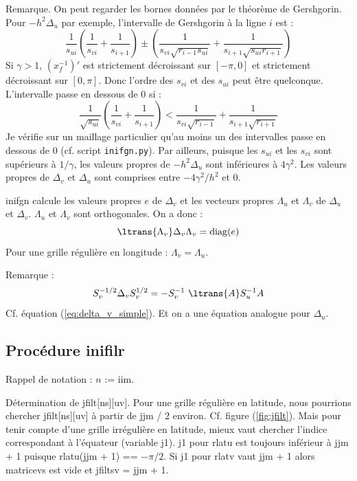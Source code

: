 \documentclass[a4paper,english,french]{article}
\begin{document}
Remarque. On peut regarder les bornes données par le théorème de
Gershgorin. Pour $- h^2 \Delta_u$ par exemple, l'intervalle de
Gershgorin à la ligne $i$ est :
\begin{equation*}
  \frac{1}{s_{ui}} \left(\frac{1}{s_{vi}} + \frac{1}{s_{i + 1}} \right)
  \pm
  \left(
    \frac{1}{s_{vi} \sqrt{r_{i - 1} s_{ui}}}
    + \frac{1}{s_{i + 1} \sqrt{s_{ui} r_{i + 1}}}
  \right)
\end{equation*}
Si $\gamma > 1$, $(x_f^{-1})'$ est strictement décroissant sur $[-
\pi, 0]$ et strictement décroissant sur $[0, \pi]$. Donc l'ordre des
$s_{vi}$ et des $s_{ui}$ peut être quelconque. L'intervalle passe en dessous
de 0 si :
\begin{equation*}
  \frac{1}{\sqrt{s_{ui}}} \left(\frac{1}{s_{vi}} + \frac{1}{s_{i + 1}} \right)
  < \frac{1}{s_{vi} \sqrt{r_{i - 1}}} + \frac{1}{s_{i + 1} \sqrt{r_{i + 1}}} 
\end{equation*}
Je vérifie sur un maillage particulier qu'au moins un des intervalles
passe en dessous de 0 (cf. script \verb+inifgn.py+). Par ailleurs,
puisque les $s_{ui}$ et les $s_{vi}$ sont supérieurs à $1 / \gamma$, les
valeurs propres de $- h^2 \Delta_u$ sont inférieures à $4
\gamma^2$. Les valeurs propres de $\Delta_v$ et $\Delta_u$ sont
comprises entre $- 4 \gamma^2 / h^2$ et 0.

inifgn calcule les valeurs propres $e$ de $\Delta_v$ et les vecteurs
propres $\Lambda_u$ et $\Lambda_v$ de $\Delta_u$ et
$\Delta_v$. $\Lambda_u$ et $\Lambda_v$ sont orthogonales. On a
donc :
\begin{equation*}
  \ltrans{\Lambda_v} \Delta_v \Lambda_v = \mathrm{diag}(e)
\end{equation*}
Pour une grille régulière en longitude : $\Lambda_v = \Lambda_u$.

Remarque :
\begin{equation*}
  S_v^{- 1 / 2} \Delta_v S_v^{1 / 2} = - S_v^{-1}\ \ltrans{A} S_u^{-1} A
\end{equation*}
Cf. équation (\ref{eq:delta_v_simple}). Et on a une équation analogue
pour $\Delta_u$.

\subsection{Procédure inifilr}

Rappel de notation : $n$ := iim.

Détermination de jfilt[ns][uv]. Pour une grille régulière en latitude,
nous pourrions chercher jfilt[ns][uv] à partir de jjm / 2
environ. Cf. figure (\ref{fig:jfilt}). Mais pour tenir compte d'une
grille irrégulière en latitude, mieux vaut chercher l'indice
correspondant à l'équateur (variable j1). j1 pour rlatu est toujours
inférieur à jjm + 1 puisque rlatu(jjm + 1) == $- \pi / 2$. Si j1 pour
rlatv vaut jjm + 1 alors matricevs est vide et jfiltsv = jjm + 1.
\end{document}
